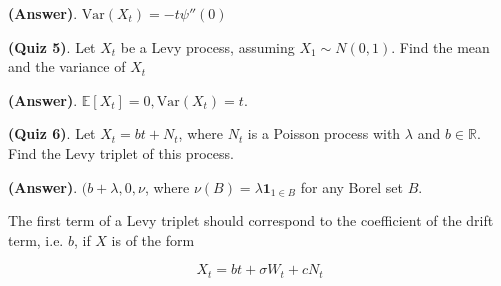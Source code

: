 \documentclass[12pt]{article}
\theoremstyle{nonumberbreak}
\begin{document}
\textbf{(Answer)}. $\mathrm{Var} (X_t) = -t \psi''(0)$


\textbf{(Quiz 5)}. Let $X_t$ be a Levy process, assuming $X_1 \sim N(0,1)$. Find the mean and the variance of $X_t$

\textbf{(Answer)}. $\mathbb{E} [X_t] = 0, \mathrm{Var} (X_t) = t$.


\textbf{(Quiz 6)}. Let $X_t = bt + N_t$, where $N_t$ is a Poisson process with $\lambda$ and $b \in \mathbb{R}$. Find the Levy triplet of this process. 

\textbf{(Answer)}. $(b + \lambda, 0, \nu$, where $\nu(B) =\lambda \mathbf{1}_{1 \in B}$ for any Borel set $B$.

The first term of a Levy triplet should correspond to the coefficient of the drift term, i.e. $b$, if $X$ is of the form

$$
X_t = bt + \sigma W_t + c N_t
$$
\end{document}
